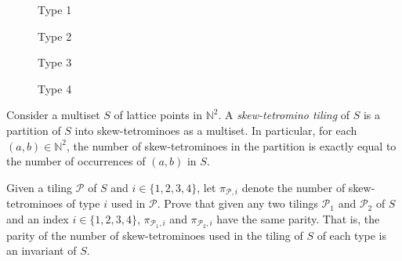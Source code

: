 \documentclass{article}
\newcommand{\N}{\mathbb{N}}
\newcommand{\cP}{\mathcal{P}}
\begin{document}
\begin{figure}[H]
\centering
\begin{minipage}{.25\linewidth}
    \centering
    \caption*{Type 1}
\end{minipage}
\begin{minipage}{.2\linewidth}
    \centering
    \caption*{Type 2}
\end{minipage}
\begin{minipage}{.2\linewidth}
    \centering
    \caption*{Type 3}
\end{minipage}
\begin{minipage}{.25\linewidth}
    \centering
    \caption*{Type 4}
\end{minipage}
\end{figure}

Consider a multiset $S$ of lattice points in $\N^2$.
A \emph{skew-tetromino tiling} of $S$ is a partition of $S$ into skew-tetrominoes as a multiset.
In particular, for each $(a, b) \in \N^2$, the number of skew-tetrominoes in the partition is exactly equal to the number of occurrences of $(a, b)$ in $S$.

Given a tiling $\cP$ of $S$ and $i \in \{1, 2, 3, 4\}$, let $\pi_{\cP, i}$ denote the number of skew-tetrominoes of type $i$ used in $\cP$.
Prove that given any two tilings $\cP_1$ and $\cP_2$ of $S$ and an index $i \in \{1, 2, 3, 4\}$, $\pi_{\cP_1, i}$ and $\pi_{\cP_2, i}$ have the same parity.
That is, the parity of the number of skew-tetrominoes used in the tiling of $S$ of each type is an invariant of $S$.
\end{document}
